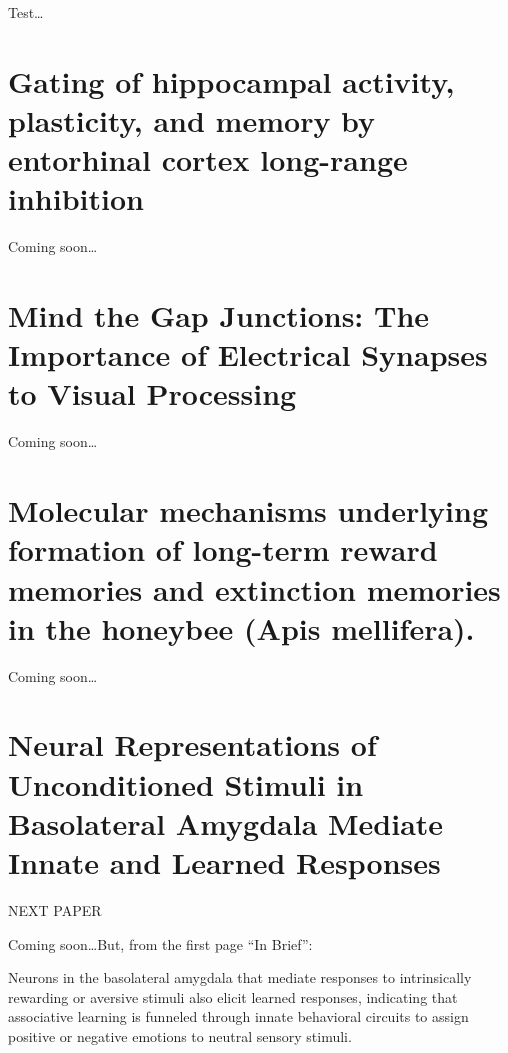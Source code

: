 \documentclass[11pt, a4paper, oneside]{article}   	%
\begin{document}
Test\ldots





\section{Gating of hippocampal activity, plasticity, and memory by entorhinal cortex long-range inhibition \cite{Basu2016}}

Coming soon\ldots

\section{Mind the Gap Junctions: The Importance of Electrical Synapses to Visual Processing \cite{Demb2016}}

Coming soon\ldots

\section{Molecular mechanisms underlying formation of long-term reward memories and extinction memories in the honeybee (Apis mellifera). \cite{Eisenhardt2014}}

Coming soon\ldots


\section{Neural Representations of Unconditioned Stimuli in Basolateral Amygdala Mediate Innate and Learned Responses \cite{Gore2015}}

NEXT PAPER
 
Coming soon\ldots But, from the first page ``In Brief'':

Neurons in the basolateral amygdala that mediate responses to intrinsically rewarding or aversive stimuli also elicit learned responses, indicating that associative learning is funneled through innate behavioral circuits to assign positive or negative emotions to neutral sensory stimuli.
\end{document}
